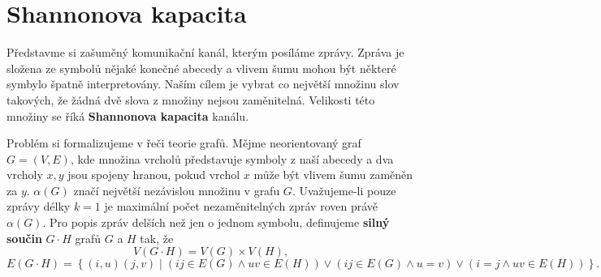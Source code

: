 \chapter{Shannonova kapacita}

Představme si zašuměný komunikační kanál, kterým posíláme zprávy. Zpráva je složena ze symbolů nějaké konečné abecedy a vlivem šumu mohou být některé symbylo špatně interpretovány. Naším cílem je vybrat co největší množinu slov takových, že žádná dvě slova z množiny nejsou zaměnitelná. Velikosti této množiny se říká \textbf{Shannonova kapacita} kanálu.

Problém si formalizujeme v řeči teorie grafů. Mějme neorientovaný graf $G = (V, E)$, kde množina vrcholů představuje symboly z naší abecedy a dva vrcholy $x, y$ jsou spojeny hranou, pokud vrchol $x$ může být vlivem šumu zaměněn za $y$. $\alpha(G)$ značí největší nezávislou množinu v grafu $G$. Uvažujeme-li pouze zprávy délky $k = 1$ je maximální počet nezaměnitelných zpráv roven právě $\alpha(G)$. Pro popis zpráv delších než jen o jednom symbolu, definujeme \textbf{silný součin} $G \cdot H$ grafů $G$ a $H$ tak, že
$$
    V(G \cdot H) = V(G) \times V(H),
$$
$$
    E(G \cdot H) = \left\{ (i,u)(j,v) \mid \left(ij \in E(G) \wedge uv \in E(H)\right) \vee \left(ij \in E(G) \wedge u = v\right) \vee \left( i = j \wedge uv \in E(H) \right)  \right\}.
$$